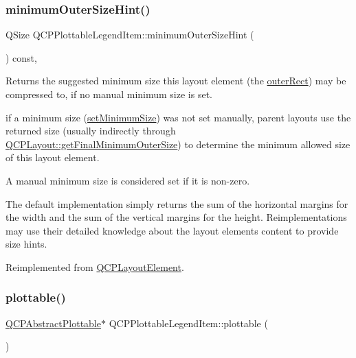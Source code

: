 \mbox{\label{class_q_c_p_plottable_legend_item_a8b543f3ac32b2fe59326e01c1101b3b8}} 
\subsubsection{\texorpdfstring{minimumOuterSizeHint()}{minimumOuterSizeHint()}}
{\footnotesize\ttfamily Q\+Size Q\+C\+P\+Plottable\+Legend\+Item\+::minimum\+Outer\+Size\+Hint (\begin{DoxyParamCaption}{ }\end{DoxyParamCaption}) const\hspace{0.3cm}{\ttfamily [protected]}, {\ttfamily [virtual]}}

Returns the suggested minimum size this layout element (the \mbox{\hyperlink{class_q_c_p_layout_element_a2a32a12a6161c9dffbadeb9cc585510c}{outer\+Rect}}) may be compressed to, if no manual minimum size is set.

if a minimum size (\mbox{\hyperlink{class_q_c_p_layout_element_a5dd29a3c8bc88440c97c06b67be7886b}{set\+Minimum\+Size}}) was not set manually, parent layouts use the returned size (usually indirectly through \mbox{\hyperlink{class_q_c_p_layout_a864fddc84721f186663faf3683f1fa70}{Q\+C\+P\+Layout\+::get\+Final\+Minimum\+Outer\+Size}}) to determine the minimum allowed size of this layout element.

A manual minimum size is considered set if it is non-\/zero.

The default implementation simply returns the sum of the horizontal margins for the width and the sum of the vertical margins for the height. Reimplementations may use their detailed knowledge about the layout element\textquotesingle{}s content to provide size hints. 

Reimplemented from \mbox{\hyperlink{class_q_c_p_layout_element_a46789036c4fcb190fa374f91321d7c09}{Q\+C\+P\+Layout\+Element}}.

\mbox{\label{class_q_c_p_plottable_legend_item_af29e9a2c60b4cba0cac2447b8af7b488}} 
\subsubsection{\texorpdfstring{plottable()}{plottable()}}
{\footnotesize\ttfamily \mbox{\hyperlink{class_q_c_p_abstract_plottable}{Q\+C\+P\+Abstract\+Plottable}}$\ast$ Q\+C\+P\+Plottable\+Legend\+Item\+::plottable (\begin{DoxyParamCaption}{ }\end{DoxyParamCaption})\hspace{0.3cm}{\ttfamily [inline]}}



